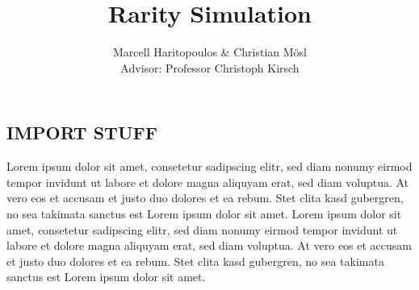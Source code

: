 \documentclass[10pt]{beamer}
\title{Rarity Simulation}
\date{}
\author{Marcell Haritopoulos & Christian Mösl \\
Advisor: Professor Christoph Kirsch}
\begin{document}
\maketitle

\begin{frame}
    \tableofcontents
\end{frame}

\begin{frame}
    \section{IMPORT STUFF}
\end{frame}

\begin{frame}
    Lorem ipsum dolor sit amet, consetetur sadipscing elitr, sed diam nonumy eirmod tempor invidunt ut labore et dolore magna aliquyam erat, sed diam voluptua. At vero eos et accusam et justo duo dolores et ea rebum. Stet clita kasd gubergren, no sea takimata sanctus est Lorem ipsum dolor sit amet. Lorem ipsum dolor sit amet, consetetur sadipscing elitr, sed diam nonumy eirmod tempor invidunt ut labore et dolore magna aliquyam erat, sed diam voluptua. At vero eos et accusam et justo duo dolores et ea rebum. Stet clita kasd gubergren, no sea takimata sanctus est Lorem ipsum dolor sit amet.
    
\end{frame}


\begin{frame}[allowframebreaks]
    \printbibliography
\end{frame}
\end{document}
